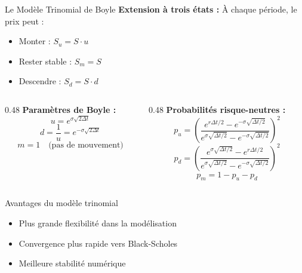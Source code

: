 \documentclass[aspectratio=169, 10pt]{beamer}
\begin{document}
\begin{frame}{Le Modèle Trinomial de Boyle}
    \textbf{Extension à trois états :} À chaque période, le prix peut :
    \begin{itemize}
        \item Monter : $S_u = S \cdot u$
        \item Rester stable : $S_m = S$
        \item Descendre : $S_d = S \cdot d$
    \end{itemize}
    
    \vspace{0.3cm}
    \begin{columns}[T]
        \begin{column}{0.48\textwidth}
            \textbf{Paramètres de Boyle :}
            $$u = e^{\sigma\sqrt{2\Delta t}}$$
            $$d = \frac{1}{u} = e^{-\sigma\sqrt{2\Delta t}}$$
            $$m = 1 \quad \text{(pas de mouvement)}$$
        \end{column}
        \begin{column}{0.48\textwidth}
            \textbf{Probabilités risque-neutres :}
            $$p_u = \left(\frac{e^{r\Delta t/2} - e^{-\sigma\sqrt{\Delta t/2}}}{e^{\sigma\sqrt{\Delta t/2}} - e^{-\sigma\sqrt{\Delta t/2}}}\right)^2$$
            $$p_d = \left(\frac{e^{\sigma\sqrt{\Delta t/2}} - e^{r\Delta t/2}}{e^{\sigma\sqrt{\Delta t/2}} - e^{-\sigma\sqrt{\Delta t/2}}}\right)^2$$
            $$p_m = 1 - p_u - p_d$$
        \end{column}
    \end{columns}
    
    \vspace{0.3cm}
    \begin{block}{Avantages du modèle trinomial}
    \begin{itemize}
        \item Plus grande flexibilité dans la modélisation
        \item Convergence plus rapide vers Black-Scholes
        \item Meilleure stabilité numérique
    \end{itemize}
    \end{block}
\end{frame}
\end{document}
